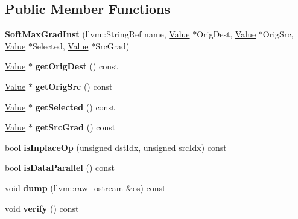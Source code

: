 \subsection*{Public Member Functions}
\begin{DoxyCompactItemize}
\item 
\mbox{\label{classglow_1_1_soft_max_grad_inst_a0d8a7a032c6cf662b95d78e9a0029ced}} 
{\bfseries Soft\+Max\+Grad\+Inst} (llvm\+::\+String\+Ref name, \hyperlink{classglow_1_1_value}{Value} $\ast$Orig\+Dest, \hyperlink{classglow_1_1_value}{Value} $\ast$Orig\+Src, \hyperlink{classglow_1_1_value}{Value} $\ast$Selected, \hyperlink{classglow_1_1_value}{Value} $\ast$Src\+Grad)
\item 
\mbox{\label{classglow_1_1_soft_max_grad_inst_abf8260cae0854ff140e0360b34d66c16}} 
\hyperlink{classglow_1_1_value}{Value} $\ast$ {\bfseries get\+Orig\+Dest} () const
\item 
\mbox{\label{classglow_1_1_soft_max_grad_inst_a4c4b638865eb0406f2a380cc1de0f509}} 
\hyperlink{classglow_1_1_value}{Value} $\ast$ {\bfseries get\+Orig\+Src} () const
\item 
\mbox{\label{classglow_1_1_soft_max_grad_inst_a04357ac5d26e7e470d78868725ad460b}} 
\hyperlink{classglow_1_1_value}{Value} $\ast$ {\bfseries get\+Selected} () const
\item 
\mbox{\label{classglow_1_1_soft_max_grad_inst_a43fa911466ac744a5df1d5d9c3336494}} 
\hyperlink{classglow_1_1_value}{Value} $\ast$ {\bfseries get\+Src\+Grad} () const
\item 
\mbox{\label{classglow_1_1_soft_max_grad_inst_a5cd295c439dfb893c09a253c7414d745}} 
bool {\bfseries is\+Inplace\+Op} (unsigned dst\+Idx, unsigned src\+Idx) const
\item 
\mbox{\label{classglow_1_1_soft_max_grad_inst_a2ab7f40ef909cbccbd53c6a89b3b3e71}} 
bool {\bfseries is\+Data\+Parallel} () const
\item 
\mbox{\label{classglow_1_1_soft_max_grad_inst_a4c47713302b4451bc8315237d30781da}} 
void {\bfseries dump} (llvm\+::raw\+\_\+ostream \&os) const
\item 
\mbox{\label{classglow_1_1_soft_max_grad_inst_aa311455a2fbfb23ff78c8bdab2fc003e}} 
void {\bfseries verify} () const
\end{DoxyCompactItemize}
